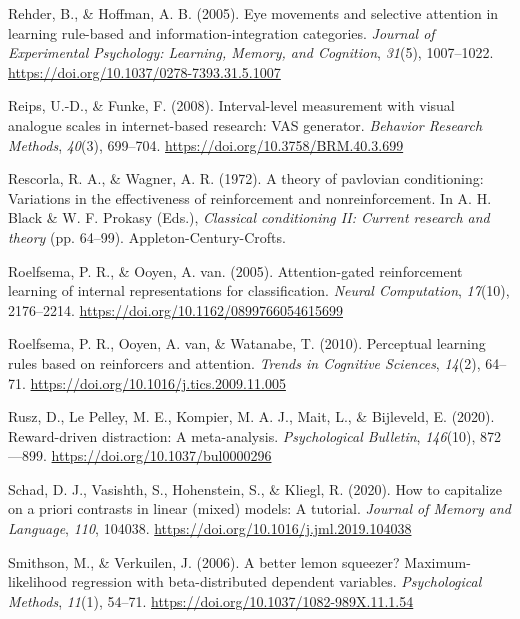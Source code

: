 \documentclass[
  man,
  floatsintext,
  longtable,
  nolmodern,
  notxfonts,
  notimes,
  mask,
  colorlinks=true,linkcolor=blue,citecolor=blue,urlcolor=blue]{apa7}
\newlength{\cslhangindent}
\newenvironment{CSLReferences}[2] %
 {\begin{list}{}{%
  \setlength{\itemindent}{0pt}
  \setlength{\leftmargin}{0pt}
  \setlength{\parsep}{0pt}
  \ifodd #1
   \setlength{\leftmargin}{\cslhangindent}
   \setlength{\itemindent}{-1\cslhangindent}
  \fi
  \setlength{\itemsep}{#2\baselineskip}}}
 {\end{list}}
\begin{document}
\begin{CSLReferences}{1}{0}
Rehder, B., \& Hoffman, A. B. (2005). Eye movements and selective
attention in learning rule-based and information-integration categories.
\emph{Journal of Experimental Psychology: Learning, Memory, and
Cognition}, \emph{31}(5), 1007--1022.
\url{https://doi.org/10.1037/0278-7393.31.5.1007}

Reips, U.-D., \& Funke, F. (2008). Interval-level measurement with
visual analogue scales in internet-based research: VAS generator.
\emph{Behavior Research Methods}, \emph{40}(3), 699--704.
\url{https://doi.org/10.3758/BRM.40.3.699}

Rescorla, R. A., \& Wagner, A. R. (1972). A theory of pavlovian
conditioning: Variations in the effectiveness of reinforcement and
nonreinforcement. In A. H. Black \& W. F. Prokasy (Eds.),
\emph{Classical conditioning II: Current research and theory} (pp.
64--99). Appleton-Century-Crofts.

Roelfsema, P. R., \& Ooyen, A. van. (2005). Attention-gated
reinforcement learning of internal representations for classification.
\emph{Neural Computation}, \emph{17}(10), 2176--2214.
\url{https://doi.org/10.1162/0899766054615699}

Roelfsema, P. R., Ooyen, A. van, \& Watanabe, T. (2010). Perceptual
learning rules based on reinforcers and attention. \emph{Trends in
Cognitive Sciences}, \emph{14}(2), 64--71.
\url{https://doi.org/10.1016/j.tics.2009.11.005}

Rusz, D., Le Pelley, M. E., Kompier, M. A. J., Mait, L., \& Bijleveld,
E. (2020). Reward-driven distraction: A meta-analysis.
\emph{Psychological Bulletin}, \emph{146}(10), 872---899.
\url{https://doi.org/10.1037/bul0000296}

Schad, D. J., Vasishth, S., Hohenstein, S., \& Kliegl, R. (2020). How to
capitalize on a priori contrasts in linear (mixed) models: A tutorial.
\emph{Journal of Memory and Language}, \emph{110}, 104038.
\url{https://doi.org/10.1016/j.jml.2019.104038}

Smithson, M., \& Verkuilen, J. (2006). A better lemon squeezer?
Maximum-likelihood regression with beta-distributed dependent variables.
\emph{Psychological Methods}, \emph{11}(1), 54--71.
\url{https://doi.org/10.1037/1082-989X.11.1.54}


\end{CSLReferences}
\end{document}
